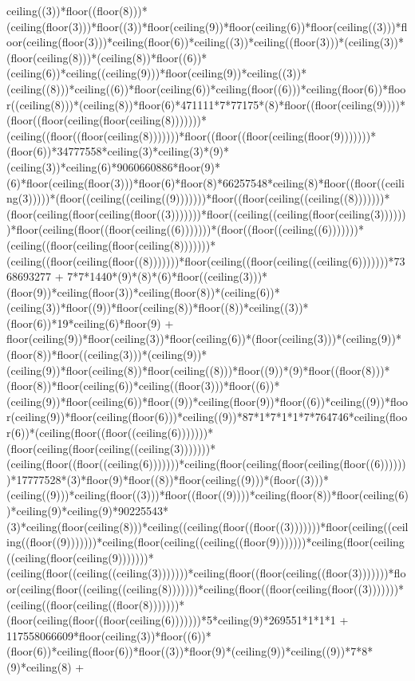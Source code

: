 ceiling((3))*floor((floor(8)))*(ceiling(floor(3)))*floor((3))*floor(ceiling(9))*floor(ceiling(6))*floor(ceiling((3)))*floor(ceiling(floor(3)))*ceiling(floor(6))*ceiling((3))*ceiling((floor(3)))*(ceiling(3))*(floor(ceiling(8)))*(ceiling(8))*floor((6))*(ceiling(6))*ceiling((ceiling(9)))*floor(ceiling(9))*ceiling((3))*(ceiling((8)))*ceiling((6))*floor(ceiling(6))*ceiling(floor((6)))*ceiling(floor(6))*floor((ceiling(8)))*(ceiling(8))*floor(6)*471111*7*77175*(8)*floor((floor(ceiling(9))))*(floor((floor(ceiling(floor(ceiling(8)))))))*(ceiling((floor((floor(ceiling(8)))))))*floor((floor((floor(ceiling(floor(9)))))))*(floor(6))*34777558*ceiling(3)*ceiling(3)*(9)*(ceiling(3))*ceiling(6)*9060660886*floor(9)*(6)*floor(ceiling(floor(3)))*floor(6)*floor(8)*66257548*ceiling(8)*floor((floor((ceiling(3)))))*(floor((ceiling((ceiling((9)))))))*floor((floor(ceiling((ceiling((8)))))))*(floor(ceiling(floor(ceiling(floor((3)))))))*floor((ceiling((ceiling(floor(ceiling(3)))))))*floor(ceiling(floor((floor(ceiling((6)))))))*(floor((floor((ceiling((6)))))))*(ceiling((floor(ceiling(floor(ceiling(8)))))))*(ceiling((floor(ceiling(floor((8)))))))*floor(ceiling((floor(ceiling((ceiling(6)))))))*7368693277 + 7*7*1440*(9)*(8)*(6)*floor((ceiling(3)))*(floor(9))*ceiling(floor(3))*ceiling(floor(8))*(ceiling(6))*(ceiling(3))*floor((9))*floor(ceiling(8))*floor((8))*ceiling((3))*(floor(6))*19*ceiling(6)*floor(9) + floor(ceiling(9))*floor(ceiling(3))*floor(ceiling(6))*(floor(ceiling(3)))*(ceiling(9))*(floor(8))*floor((ceiling(3)))*(ceiling(9))*(ceiling(9))*floor(ceiling(8))*floor(ceiling((8)))*floor((9))*(9)*floor((floor(8)))*(floor(8))*floor(ceiling(6))*ceiling((floor(3)))*floor((6))*(ceiling(9))*floor(ceiling(6))*floor((9))*ceiling(floor(9))*floor((6))*ceiling((9))*floor(ceiling(9))*floor(ceiling(floor(6)))*ceiling((9))*87*1*7*1*1*7*764746*ceiling(floor(6))*(ceiling(floor((floor((ceiling(6)))))))*(floor(ceiling(floor(ceiling((ceiling(3)))))))*(ceiling(floor((floor((ceiling(6)))))))*ceiling(floor(ceiling(floor(ceiling(floor((6)))))))*17777528*(3)*floor(9)*floor((8))*floor(ceiling((9)))*(floor((3)))*(ceiling((9)))*ceiling(floor((3)))*floor((floor((9))))*ceiling(floor(8))*floor(ceiling(6))*ceiling(9)*ceiling(9)*90225543*(3)*ceiling(floor(ceiling(8)))*ceiling((ceiling(floor((floor((3)))))))*floor(ceiling((ceiling((floor((9)))))))*ceiling(floor(ceiling((ceiling((floor(9)))))))*ceiling(floor(ceiling((ceiling(floor(ceiling(9)))))))*(ceiling(floor((ceiling((ceiling(3)))))))*ceiling(floor((floor(ceiling((floor(3)))))))*floor(ceiling(floor((ceiling((ceiling(8)))))))*ceiling(floor((floor(ceiling(floor((3)))))))*(ceiling((floor(ceiling((floor(8)))))))*(floor(ceiling(floor((floor(ceiling(6)))))))*5*ceiling(9)*269551*1*1*1 + 117558066609*floor(ceiling(3))*floor((6))*(floor(6))*ceiling(floor(6))*floor((3))*floor(9)*(ceiling(9))*ceiling((9))*7*8*(9)*ceiling(8) + 